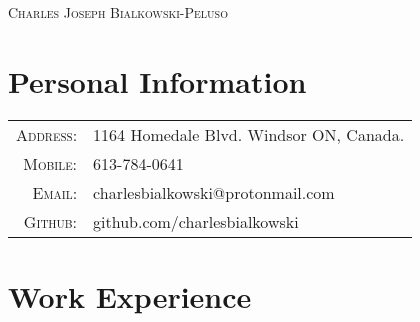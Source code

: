 \documentclass[a4paper,10pt]{article}
\begin{document}
\pagestyle{empty}
\par{\centering
		{\Huge   \textsc{Charles Joseph Bialkowski-Peluso}
	}\bigskip\par}

\section{Personal Information}

\begin{tabular}{rl} 
    \textsc{Address:}   & 1164 Homedale Blvd. Windsor ON, Canada.\\
    \textsc{Mobile:}     & 613-784-0641\\
    \textsc{Email:}     & charlesbialkowski@protonmail.com \\ 
    \textsc{Github:} 	& github.com/charlesbialkowski \\
\end{tabular}

\section{Work Experience}
\end{document}
